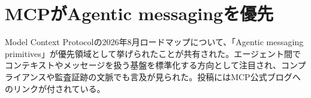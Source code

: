 \section{MCPがAgentic messagingを優先}
Model Context Protocolの2026年8月ロードマップについて、「Agentic messaging primitives」が優先領域として挙げられたことが共有された。エージェント間でコンテキストやメッセージを扱う基盤を標準化する方向として注目され、コンプライアンスや監査証跡の文脈でも言及が見られた。投稿にはMCP公式ブログへのリンクが付されている。
